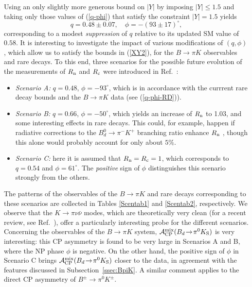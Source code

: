\documentclass[12pt]{article}
\begin{document}
Using an only slightly more generous bound on $|Y|$ by imposing 
$\left|Y \right| \leq 1.5$ and taking only those values of (\ref{q-phi}) 
that satisfy the constraint $\left|Y \right|=1.5$ yields
\begin{equation}
\label{q-phi-RD}
q= 0.48 \pm 0.07 ,\quad \phi=-(93 \pm 17 )^\circ,
\end{equation}
corresponding to a modest {\it suppression} of $q$ relative to its
updated SM value of $0.58$. It is interesting to investigate the impact
of various modifications of $(q,\phi)$, which allow us to satisfy the bounds 
in (\ref{XY2}), for the $B\to\pi K$ observables and rare decays. To this
end, three scenarios for the possible future evolution of the measurements
of $R_{\rm n}$ and $R_{\rm c}$ were introduced in Ref.~\cite{BFRS-5}:
\begin{itemize}
\item {\it Scenario A:} $q=0.48$, $\phi = -93^{\circ}$, which is in accordance with 
the currrent rare decay bounds and the $B \to \pi K$ data (see (\ref{q-phi-RD})).
\item {\it Scenario B:} $q=0.66$, $\phi=-50^{\circ}$, which yields an increase
of $R_{\rm n}$ to 1.03, and some interesting effects in rare decays. This could,
for example, happen if radiative corrections to the  $B_d^0\to\pi^- K^+$ branching 
ratio enhance $R_{\rm n}$ \cite{Baracchini:2005wp}, though this alone would 
probably account for only about $5\%$.
\item {\it Scenario C:} here it is assumed that $R_{\rm n}=R_{\rm c}=1$, which
corresponds to $q=0.54$ and $\phi=61^{\circ}$. The {\it positive} sign of 
$\phi$ distinguishes this scenario strongly from the others.
\end{itemize}
The patterns of the observables of the $B\to\pi K$ and rare decays corresponding
to these scenarios are collected in Tables \ref{Scentab1} and \ref{Scentab2},
respectively. We observe that the $K \to \pi \nu \bar \nu$ modes, which are
theoretically very clean (for a recent review, see Ref.~\cite{BSU}), offer a particularly
interesting probe for the different scenarios. Concerning the observables of the 
$B \to \pi K$ system, ${\cal A}_{\rm CP}^{\rm mix}(B_d\!\to\!\pi^0 K_{\rm S})$ 
is very interesting: this CP asymmetry is found to be very large in Scenarios A and B, 
where the NP phase $\phi$ is negative. On the other hand, the positive sign of 
$\phi$ in Scenario C brings ${\cal A}_{\rm CP}^{\rm mix}(B_d\!\to\!\pi^0 K_{\rm S})$ 
closer to the data, in agreement with the features discussed in
Subsection~\ref{ssec:BpiK}. A similar comment applies to the
direct CP asymmetry of $B^\pm\to\pi^0K^\pm$. 
\end{document}

